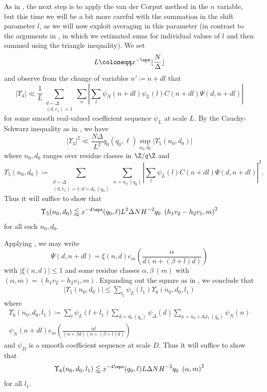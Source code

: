 As in \cite[\S 10]{polymath8a}, the next step is to apply the van der Corput method in the $n$ variable, but this time we will be a bit more careful with the summation in the shift parameter $l$, as we will now exploit averaging in this parameter (in contrast to the arguments in \cite{polymath8a}, in which we estimated sums for individual values of $l$ and then summed using the triangle inequality). We set
\begin{equation}\label{L-def}
L \coloneqq x^{-\eps} \lfloor \frac{N}{\Delta} \rfloor
\end{equation}
and observe from the change of variables $n' \coloneqq n+dl$ that
$$ |\Upsilon_4| \ll \frac{1}{L} \sum_{\substack{d\sim \Delta\\(d,r_1)=1}} \sum_n |\sum_l \psi_N(n+dl) \psi_L(l) C(n+dl) \Psi(d,n+dl)|$$
for some smooth real-valued coefficient sequence $\psi_L$ at scale $L$.  By the Cauchy-Schwarz inequality as in \cite[\S 10]{polymath8a}, we have
$$ |\Upsilon_4|^2 \ll \frac{N \Delta}{L^2} q_0 (q_0,\ell) \sup_{n_0,d_0} |\Upsilon_5(n_0,d_0)|$$
where $n_0,d_0$ ranges over residue classes in $\Z/q\Z$ and
$$ \Upsilon_5(n_0,d_0) \coloneqq \sum_{\substack{d\sim \Delta\\(d,r_1)=1; d = d_0\ (q_0)}} \sum_{n = n_0\ (q_0)} |\sum_l \psi_L(l) C(n+dl) \Psi(d,n+dl)|^2.$$
 Thus it will suffice to show that
$$
\Upsilon_5(n_0,d_0) \lessapprox 
x^{-4\eps} (q_0,\ell) L^2 \Delta
N H^{-2}q_0 \ \left(h_1v_2-h_2v_1,m\right)^2$$
for all such $n_0,d_0$.

Applying \cite[Lemma 10.3]{polymath8a}, we may write
$$ \Psi(d,n+dl) = \xi(n,d) e_m\left( \frac{\alpha}{d(n+(\beta+l)d)} \right)$$
with $|\xi(n,d)| \leq 1$ and some residue classes $\alpha, \beta\ (m)$ with $(\alpha,m) = (h_1v_2-h_2v_1,m)$.  Expanding out the square as in \cite[\S 10]{polymath8a}, we conclude that
\begin{multline}\label{eq-bound-up5}
  |\Upsilon_5(n_0,d_0)|\leq \sum_{l_1} \psi_L(l_1) \Upsilon_6( n_0, d_0, l_1 )
\end{multline}
where
\begin{multline}\label{eq-upsilon-6}
  \Upsilon_6(n_0,d_0,l_1)\coloneqq \sum_l \psi_L(l+l_1) \sum_{d=d_0\ (q_0)} \psi_{\Delta}(d)
  \sum_{n=n_0+d_0l_1\ (q_0)} \psi_N(n)\\
  \psi_N(n+dl)e_m\left(\frac{\alpha l}{(n+\beta d)(n+(\beta+l)d)}
  \right)
\end{multline}
and $\psi_D$ is a smooth coefficient sequence at scale $D$.
Thus it will suffice to show that
$$
\Upsilon_6(n_0,d_0, l_1) \lessapprox 
x^{-4\eps} (q_0,\ell) L \Delta
N H^{-2}q_0 \ \left(\alpha,m\right)^2$$
for all $l_1$.

